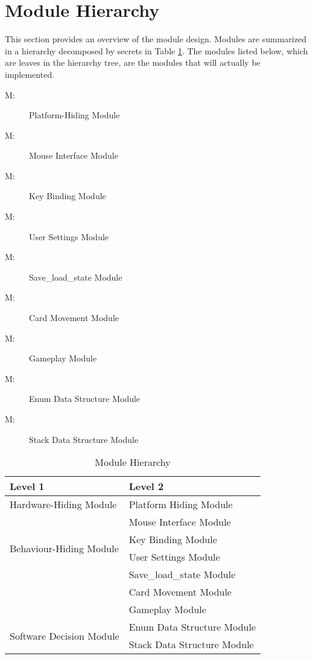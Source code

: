\documentclass[12pt, titlepage]{article}
\newcounter{mnum}
\newcommand{\mthemnum}{M\themnum}
\begin{document}
	\section{Module Hierarchy} \label{SecMH}
	This section provides an overview of the module design. Modules are 
	summarized in a hierarchy decomposed by secrets in Table \ref{TblMH}. The 
	modules listed below, which are leaves in the hierarchy tree, are the 
	modules that will actually be implemented.
	\begin{description}
		\item [ \mthemnum \label{mPH}:] Platform-Hiding 
		Module
		\item [ \mthemnum \label{mMI}:] Mouse Interface 
		Module
		\item [ \mthemnum \label{mKB}:] Key Binding 
		Module
		\item [ \mthemnum \label{mUS}:] User Settings 
		Module
		\item [ \mthemnum \label{mSL}:] Save\_load\_state 
		Module
		\item [ \mthemnum \label{mCM}:] Card Movement 
		Module
		\item [ \mthemnum \label{mGP}:] Gameplay Module
		\item [ \mthemnum \label{mEnum}:] Enum Data 
		Structure Module
		\item [ \mthemnum \label{mStack}:] Stack Data 
		Structure Module
	\end{description}
	\begin{table}[h!]
		\centering
		\begin{tabular}{p{} p{}}
			\toprule
			\textbf{Level 1} & \textbf{Level 2}\\
			\midrule
			{Hardware-Hiding Module} & Platform Hiding Module \\
			\midrule
			\multirow{4}{0.3\textwidth}{Behaviour-Hiding Module}
			& Mouse Interface Module\\
			& Key Binding Module\\
			& User Settings Module\\
			& Save\_load\_state Module\\
			& Card Movement Module\\
			& Gameplay Module\\
			\midrule
			\multirow{2}{0.3\textwidth}{Software Decision Module}
			& Enum Data Structure Module\\
			& Stack Data Structure Module\\
			\bottomrule
		\end{tabular}
		\caption{Module Hierarchy}
		\label{TblMH}
	\end{table}
\end{document}
